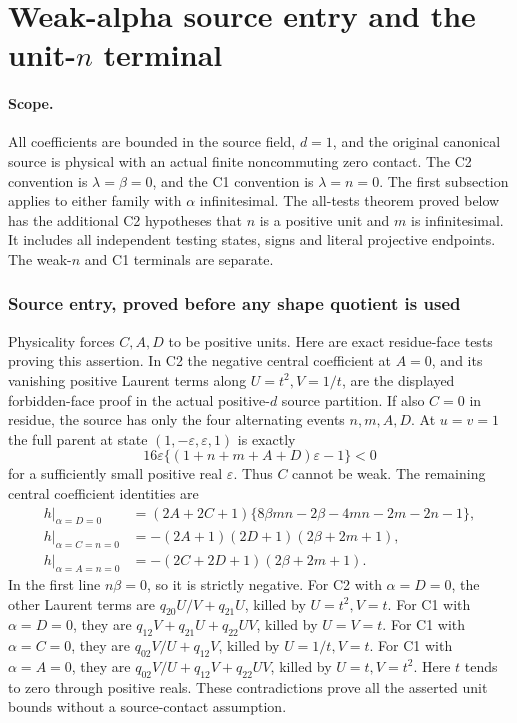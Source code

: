 \section{\texorpdfstring{Weak-alpha source entry and the unit-\(n\) terminal}{Weak-alpha source entry and the unit-n terminal}}
\label{component:p3a3949869b9e}

\label{p3a3949869b9e:sec:new-weak-alpha-unit-n}

\paragraph{Scope.}
All coefficients are bounded in the source field, \(d=1\), and the
original canonical source is physical with an actual finite noncommuting
zero contact. The C2 convention is \(\lambda=\beta=0\), and the C1
convention is \(\lambda=n=0\). The first subsection applies to either
family with \(\alpha\) infinitesimal. The all-tests theorem proved below
has the additional C2 hypotheses that \(n\) is a positive unit and \(m\)
is infinitesimal. It includes all independent testing states, signs and
literal projective endpoints. The weak-\(n\) and C1 terminals are separate.

\subsubsection*{Source entry, proved before any shape quotient is used}

Physicality forces \(C,A,D\) to be positive units. Here are exact
residue-face tests proving this assertion. In C2 the negative central
coefficient at \(A=0\), and its vanishing positive Laurent terms along
\(U=t^2,V=1/t\), are the displayed forbidden-face proof in the actual
positive-\(d\) source partition. If also \(C=0\) in residue, the source
has only the four alternating events \(n,m,A,D\). At \(u=v=1\) the full
parent at state \((1,-\varepsilon,\varepsilon,1)\) is exactly
\[
 16\varepsilon\{(1+n+m+A+D)\varepsilon-1\}<0
 \tag{WA1}
\]
for a sufficiently small positive real \(\varepsilon\).
Thus \(C\) cannot be weak. The remaining central coefficient identities
are
\[
\begin{aligned}
h|_{\alpha=D=0}
 &=(2A+2C+1)\{8\beta mn-2\beta-4mn-2m-2n-1\},\\
h|_{\alpha=C=n=0}
 &=-(2A+1)(2D+1)(2\beta+2m+1),\\
h|_{\alpha=A=n=0}
 &=-(2C+2D+1)(2\beta+2m+1).
\end{aligned}\tag{WA2}
\]
In the first line \(n\beta=0\), so it is strictly negative. For C2
with \(\alpha=D=0\), the other Laurent terms are
\(q_{20}U/V+q_{21}U\), killed by \(U=t^2,V=t\).
For C1 with \(\alpha=D=0\), they are
\(q_{12}V+q_{21}U+q_{22}UV\), killed by \(U=V=t\).
For C1 with \(\alpha=C=0\), they are \(q_{02}V/U+q_{12}V\),
killed by \(U=1/t,V=t\). For C1 with \(\alpha=A=0\), they are
\(q_{02}V/U+q_{12}V+q_{22}UV\), killed by \(U=t,V=t^2\).
Here \(t\) tends to zero through positive reals. These contradictions
prove all the asserted unit bounds without a source-contact assumption.

